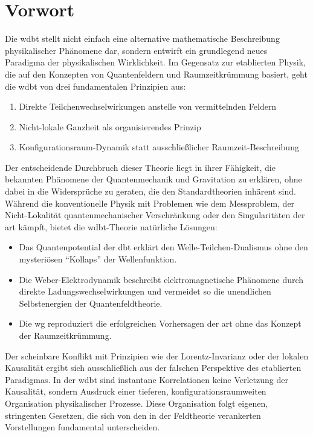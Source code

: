 \documentclass[11pt, a5paper, twoside, openright]{book}
\begin{document}
\chapter*{Vorwort}
Die \gls{wdbt} stellt nicht einfach eine alternative mathematische Beschreibung physikalischer Phänomene dar, sondern entwirft ein grundlegend neues Paradigma der physikalischen Wirklichkeit.
Im Gegensatz zur etablierten Physik, die auf den Konzepten von Quantenfeldern und Raumzeitkrümmung basiert, geht die \gls{wdbt} von drei fundamentalen Prinzipien aus:
\begin{enumerate}
    \item Direkte Teilchenwechselwirkungen anstelle von vermittelnden Feldern
    \item Nicht-lokale Ganzheit als organisierendes Prinzip
    \item Konfigurationsraum-Dynamik statt ausschließlicher Raumzeit-Beschreibung
\end{enumerate}
Der entscheidende Durchbruch dieser Theorie liegt in ihrer Fähigkeit, die bekannten Phänomene der Quantenmechanik und Gravitation zu erklären, ohne dabei in die Widersprüche zu geraten,
die den Standardtheorien inhärent sind. Während die konventionelle Physik mit Problemen wie dem Messproblem, der Nicht-Lokalität quantenmechanischer Verschränkung oder den Singularitäten
der \gls{art} kämpft, bietet die \gls{wdbt}-Theorie natürliche Lösungen:
\begin{itemize}
    \item Das Quantenpotential der \gls{dbt} erklärt den Welle-Teilchen-Dualismus ohne den mysteriösen \enquote{Kollaps} der Wellenfunktion.
    \item Die Weber-Elektrodynamik beschreibt elektromagnetische Phänomene durch direkte Ladungswechselwirkungen und vermeidet so die unendlichen Selbstenergien der Quantenfeldtheorie.
    \item Die \gls{wg} reproduziert die erfolgreichen Vorhersagen der \gls{art} ohne das Konzept der Raumzeitkrümmung.
\end{itemize}
Der scheinbare Konflikt mit Prinzipien wie der Lorentz-Invarianz oder der lokalen Kausalität ergibt sich ausschließlich aus der falschen Perspektive des etablierten Paradigmas.
In der \gls{wdbt} sind instantane Korrelationen keine Verletzung der Kausalität, sondern Ausdruck einer tieferen, konfigurationsraumweiten Organisation physikalischer Prozesse.
Diese Organisation folgt eigenen, stringenten Gesetzen, die sich von den in der Feldtheorie verankerten Vorstellungen fundamental unterscheiden.
\end{document}
